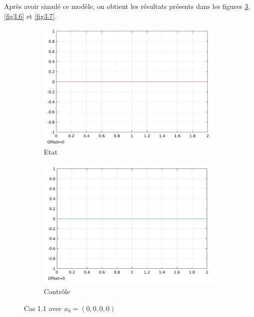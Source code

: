 \documentclass[a4paper]{article}
\begin{document}
                        Après avoir simulé ce modèle, on obtient les résultats présents dans les figures \ref{fig3.5}, \ref{fig3.6} et \ref{fig3.7}.
                        \begin{figure}[h!]
                                \centering
                                \begin{subfigure}[b]{0.45\textwidth}
                                        \includegraphics[width=\textwidth]{images/courbe_cas_1_1_TP03.png}
                                        \caption{Etat}
                                        \label{fig3.5.1}
                                \end{subfigure}
                                \hspace{30pt}
                                \begin{subfigure}[b]{0.45\textwidth}
                                        \includegraphics[width=\textwidth]{images/controle_cas_1_1_TP03.png}
                                        \caption{Contrôle}
                                        \label{fig3.5.2}
                                \end{subfigure}
                                \caption{Cas 1.1 avec $x_0=(0,0,0,0)$}
                                \label{fig3.5}
                        \end{figure}
\end{document}

